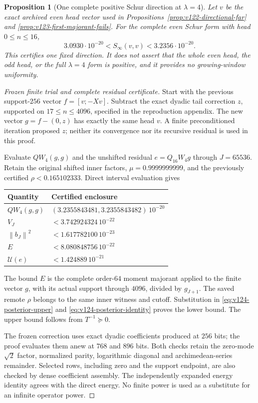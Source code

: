 \documentclass[11pt]{article}
\newtheorem{proposition}[theorem]{Proposition}
\theoremstyle{remark}
\newcommand{\norm}[1]{\left\lVert #1\right\rVert}
\begin{document}
\begin{proposition}[One complete positive Schur direction at $\lambda=4$]
\label{prop:v124-positive-direction}
Let $v$ be the exact archived even head vector used in
Propositions~\ref{prop:v122-directional-far} and
\ref{prop:v123-first-majorant-fails}. For the \emph{complete}
even Schur form with head $0\le n\le16$,
\begin{equation}\label{eq:v124-positive-direction}
 3.0930\cdot10^{-20}<S_\infty(v,v)<3.2356\cdot10^{-20}.
\end{equation}
This certifies one fixed direction. It does not assert that the
whole even head, the odd head, or the full $\lambda=4$ form is
positive, and it provides no growing-window uniformity.
\end{proposition}
\begin{proof}[Frozen finite trial and complete residual certificate]
Start with the previous support-$256$ vector $f=[v;-Xv]$.
Subtract the exact dyadic tail correction $z$, supported on
$17\le n\le4096$, specified in the reproduction appendix.
The new vector $g=f-(0,z)$ has exactly the same head $v$.
A finite preconditioned iteration proposed $z$; neither its
convergence nor its recursive residual is used in this proof.

Evaluate $QW_4(g,g)$ and the unshifted residual
$e=Q_{16}W_4g$ through $J=65536$. Retain the original shifted
inner factors, $\mu=0.9999999999$, and the previously certified
$\rho<0.165102333$. Direct interval evaluation gives
\begin{center}
\begin{tabular}{@{}ll@{}}
\toprule Quantity & Certified enclosure\\\midrule
$QW_4(g,g)$ & $(3.2355843481,3.2355843482)\,10^{-20}$\\
$V_J$ & $<3.742924324\,10^{-22}$\\
$\norm{b_J}^2$ & $<1.617782100\,10^{-23}$\\
$E$ & $<8.080848756\,10^{-22}$\\
$\mathcal U(e)$ & $<1.424889\,10^{-21}$\\\bottomrule
\end{tabular}
\end{center}
The bound $E$ is the complete order-$64$ moment majorant applied
to the finite vector $g$, with its actual support through $4096$,
divided by $g_{J+1}$. The saved remote $\rho$ belongs to the same
inner witness and cutoff. Substitution in
\eqref{eq:v124-posterior-upper} and
\eqref{eq:v124-posterior-identity} proves the lower bound.
The upper bound follows from $T^{-1}\succeq0$.

The frozen correction uses exact dyadic coefficients produced at
$256$ bits; the proof evaluates them anew at $768$ and $896$
bits. Both checks retain the zero-mode $\sqrt2$ factor, normalized
parity, logarithmic diagonal and archimedean-series remainder.
Selected rows, including zero and the support endpoint, are also
checked by dense coefficient assembly. The independently expanded
energy identity agrees with the direct energy. No finite power is
used as a substitute for an infinite operator power.
\end{proof}
\end{document}
